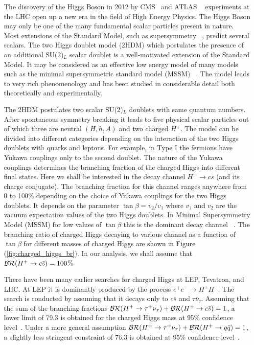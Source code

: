 The discovery of the Higgs  Boson in 2012 by CMS~\cite{Chatrchyan:2012ufa} and ATLAS
~\cite{Aad:2012tfa} experiments at the LHC open up a new era in the field of High Energy Physics. 
The Higgs Boson may only be one of the many fundamental scalar particles present in nature. 
Most extensions of the Standard Model, such as supersymmetry ~\citep{Murayama:1994kt,
Golfand:1971iw, Wess:1974tw}, predict several scalars. The two Higgs doublet model (2HDM) \cite{Branco:2011iw} which postulates the presence of an additional SU(2)$_L$ scalar doublet
is a well-motivated extension of the Standard Model. It may be considered as an effective low 
energy model of many models such as the minimal supersymmetric standard model (MSSM)
~\citep{PhysRevD.80.015017}. The model leads to very rich phenomenology and has been studied 
in considerable detail both theoretically and experimentally. 

The 2HDM postulates two scalar SU(2)$_L$ doublets with same quantum numbers. After spontaneous 
symmetry breaking it leads to five physical scalar particles out of which three are neutral 
$(H,h,A)$ and two charged $H^+$. The model can be divided into different categories depending 
on the interaction of the two Higgs doublets with quarks and leptons. 
For example, in Type I the fermions have Yukawa couplings only to the second doublet. The nature
of the Yukawa couplings determines the branching fraction of the charged Higgs into different 
final states. Here we shall be interested in the decay channel $H^+\rightarrow c\bar s$ (and its charge conjugate). The 
branching fraction for this channel ranges anywhere from 0 to 100\% depending on the choice of
Yukawa couplings for the two Higgs doublets. It depends on the parameter $\tan\beta=v_2/v_1$ 
where $v_1$ and $v_2$ are the vacuum expectation values of the two Higgs doublets. In Minimal
Supersymmetry Model (MSSM) for low values of $\tan\beta$ this is the dominant decay channel 
~\citep{PhysRevD.80.015017}. The branching ratio of charged Higgs decaying to various channel as
a function of $\tan\beta$ for different masses of charged Higgs are shown in Figure
(\ref{fig:charged_higgs_br}). 
In our analysis, we shall assume that ${\cal{BR}}(H^+\rightarrow c \bar{s}) =100$\%. 

There have been many earlier searches for charged Higgs at LEP, Tevatron, and LHC. At LEP it is
dominantly produced by the process $e^+e^-\rightarrow H^+H^-$. The search is conducted by assuming
that it decays only to $c\bar s$ and $\tau \bar \nu_\tau$. Assuming that the sum of the branching
fractions ${\cal{BR}}(H^+\rightarrow \tau^+\nu_\tau) +{\cal{BR}}(H^+\rightarrow c\bar s)=1$, a lower limit of 79.3 
\GeV is obtained for the charged Higgs mass at 95\% confidence level~\cite{Achard:2003gt,
Heister:2002ev, Abdallah:2003wd}. Under a more general assumption ${\cal{BR}}(H^+\rightarrow \tau^+\nu_\tau) 
+ {\cal{BR}}(H^+\rightarrow q\bar q)=1$, a slightly less stringent constraint of 76.3 \GeV is obtained 
at 95\% confidence level~\cite{Abbiendi:2008aa}.  

